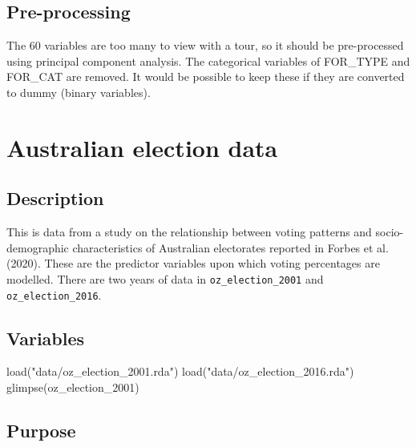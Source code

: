 \documentclass[
  letterpaper,
]{krantz}
\newenvironment{Shaded}{\begin{snugshade}}{\end{snugshade}}
\newcommand{\FunctionTok}[1]{\textcolor[rgb]{0.28,0.35,0.67}{#1}}
\newcommand{\NormalTok}[1]{\textcolor[rgb]{0.00,0.23,0.31}{#1}}
\newcommand{\StringTok}[1]{\textcolor[rgb]{0.13,0.47,0.30}{#1}}
\begin{document}
\subsection*{Pre-processing}\label{pre-processing-1}

The 60 variables are too many to view with a tour, so it should be
pre-processed using principal component analysis. The categorical
variables of FOR\_TYPE and FOR\_CAT are removed. It would be possible to
keep these if they are converted to dummy (binary variables).

\section{Australian election data}\label{australian-election-data}

\subsection*{Description}\label{description-2}

This is data from a study on the relationship between voting patterns
and socio-demographic characteristics of Australian electorates reported
in Forbes et al. (2020). These are the predictor variables upon which
voting percentages are modelled. There are two years of data in
\texttt{oz\_election\_2001} and \texttt{oz\_election\_2016}.

\subsection*{Variables}\label{variables-2}

\begin{Shaded}
\begin{Highlighting}[]
\FunctionTok{load}\NormalTok{(}\StringTok{"data/oz\_election\_2001.rda"}\NormalTok{)}
\FunctionTok{load}\NormalTok{(}\StringTok{"data/oz\_election\_2016.rda"}\NormalTok{)}
\FunctionTok{glimpse}\NormalTok{(oz\_election\_2001)}
\end{Highlighting}
\end{Shaded}

\subsection*{Purpose}\label{purpose-2}
\end{document}
